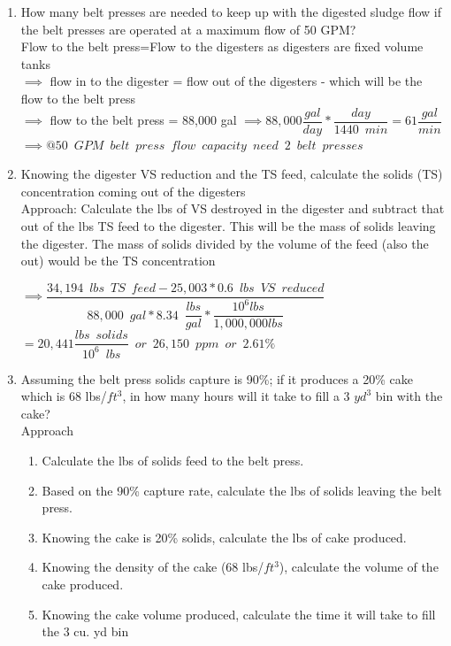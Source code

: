 \documentclass{article}
\begin{document}
\begin{enumerate}
\begin{enumerate}
\item How many belt presses are needed to keep up with the digested sludge flow if the belt presses are operated at a maximum flow of 50 GPM?\\
Flow to the belt press=Flow to the digesters as digesters are fixed volume tanks\\
$\implies$ flow in to the digester = flow out of the digesters - which will be the flow to the belt press\\
$\implies$ flow to the belt press = 88,000 gal
$\implies 88,000 \dfrac{gal}{day}*\dfrac{day}{1440 \enspace min}= 61 \dfrac{gal}{min}$\\
$\implies @ 50 \enspace GPM \enspace belt \enspace press \enspace flow \enspace capacity \enspace need \enspace \boxed{2 \enspace belt \enspace presses}$
\pagebreak
\item Knowing the digester VS reduction and the TS feed, calculate the solids (TS) concentration coming out of the digesters\\
Approach:  Calculate the lbs of VS destroyed in the digester and subtract that out of the lbs TS feed to the digester.  This will be the mass of solids leaving the digester.  The mass of solids divided by the volume of the feed (also the out) would be the TS concentration\\

\vspace{0.5cm}

$\implies \dfrac{34,194 \enspace lbs \enspace TS \enspace feed - 25,003*0.6 \enspace lbs \enspace VS \enspace reduced}{88,000 \enspace gal*8.34 \enspace \dfrac{lbs}{gal}*\dfrac{10^6lbs}{1,000,000lbs}}$\\
\vspace{0.5cm}
$=20,441\dfrac{lbs \enspace solids}{10^6 \enspace lbs} \enspace or \enspace 26,150 \enspace ppm \enspace or \enspace \boxed{2.61\%} $


\item Assuming the belt press solids capture is 90\%; if it produces a 20\% cake which is 68 lbs/$ft^3$, in how many hours will it take to fill a 3 $yd^3$ bin with the cake?\\
Approach\\
\begin{enumerate}
\item Calculate the lbs of solids feed to the belt press. \item Based on the 90\% capture rate, calculate the lbs of solids leaving the belt press.  \item Knowing the cake is 20\% solids, calculate the lbs of cake produced. \item Knowing the density of the cake (68 lbs/$ft^3$), calculate the volume of the cake produced. \item Knowing the cake volume produced, calculate the time it will take to fill the 3 cu. yd bin\end{enumerate}


\end{enumerate}
\end{enumerate}
\end{document}
